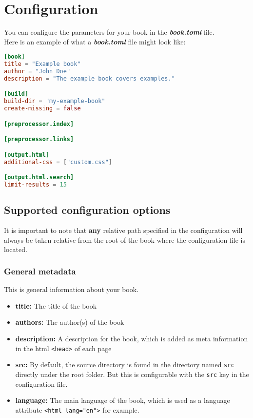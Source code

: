 \documentclass{article}
\begin{document}
\section{Configuration}
\label{Configuration}
\label{configuration}

You can configure the parameters for your book in the \emph{\textbf{book.toml}} file.\\

Here is an example of what a \emph{\textbf{book.toml}} file might look like:\\
\begin{lstlisting}[language=toml]
[book]
title = "Example book"
author = "John Doe"
description = "The example book covers examples."

[build]
build-dir = "my-example-book"
create-missing = false

[preprocessor.index]

[preprocessor.links]

[output.html]
additional-css = ["custom.css"]

[output.html.search]
limit-results = 15

\end{lstlisting}

\subsection{Supported configuration options}
\label{Supported configuration options}
\label{supported-configuration-options}

It is important to note that \textbf{any} relative path specified in the
configuration will always be taken relative from the root of the book where the
configuration file is located.\\

\subsubsection{General metadata}
\label{General metadata}
\label{general-metadata}

This is general information about your book.\\
\begin{itemize}
\item \textbf{title:} The title of the book
\item \textbf{authors:} The author(s) of the book
\item \textbf{description:} A description for the book, which is added as meta
information in the html \lstinline|<head>| of each page
\item \textbf{src:} By default, the source directory is found in the directory named
\lstinline|src| directly under the root folder. But this is configurable with the \lstinline|src|
key in the configuration file.
\item \textbf{language:} The main language of the book, which is used as a language attribute \lstinline|<html lang="en">| for example.
\end{itemize}
\end{document}
